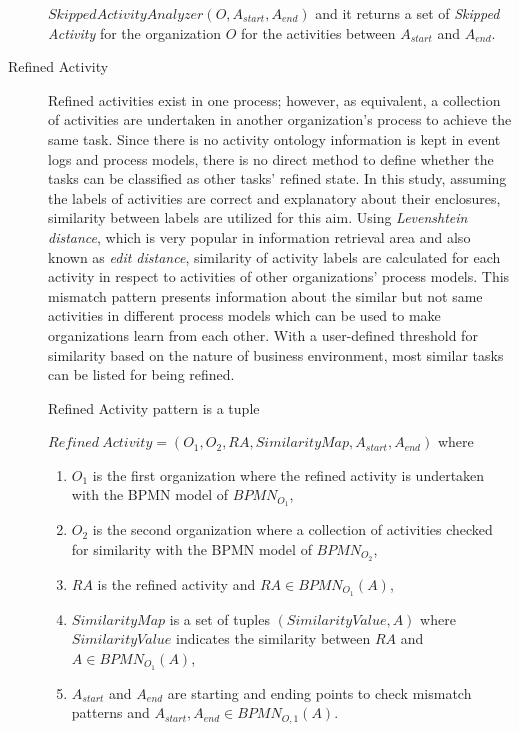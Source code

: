 \begin{description}
\begin{definition}
		$SkippedActivityAnalyzer(O, A_{start}, A_{end})$ and it returns a set of \textit{Skipped Activity} for the organization $O$ for the activities between $A_{start}$ and $A_{end}$.
		\end{definition}
  \item[Refined Activity] Refined activities exist in one process; however, as equivalent, a collection of activities are undertaken in another organization's process to achieve the same task. Since there is no activity ontology information is kept in event logs and process models, there is no direct method to define whether the tasks can be classified as other tasks' refined state. In this study, assuming the labels of activities are correct and explanatory about their enclosures, similarity between labels are utilized for this aim. Using \textit{Levenshtein distance}, which is very popular in information retrieval area and also known as \textit{edit distance}, similarity of activity labels are calculated for each activity in respect to activities of other organizations' process models. This mismatch pattern presents information about the similar but not same activities in different process models which can be used to make organizations learn from each other. With a user-defined threshold for similarity based on the nature of business environment, most similar tasks can be listed for being refined.
		\theoremstyle{definition}
		\begin{definition}
		Refined Activity pattern is a tuple 

		${Refined\ Activity} = (O_{1}, O_{2}, RA, SimilarityMap, A_{start}, A_{end}) $ where 
		\begin{enumerate}
		  \item $O_{1}$ is the first organization where the refined activity is undertaken with the BPMN model of $BPMN_{{O}_{1}}$,
		  \item $O_{2}$ is the second organization where a collection of activities checked for similarity with the BPMN model of $BPMN_{{O}_{2}}$,
		  \item $RA$ is the refined activity and $RA \in BPMN_{{O}_{1}}(A)$,
		  \item $SimilarityMap$ is a set of tuples $(SimilarityValue, A)$ where $SimilarityValue$ indicates the similarity between $RA$ and $A \in BPMN_{{O}_{1}}(A)$, 
 		  \item $A_{start}$ and $A_{end}$ are starting and ending points to check mismatch patterns and $A_{start}, A_{end} \in BPMN_{O,1}(A)$.
		\end{enumerate}
		\end{definition}


\end{description}
